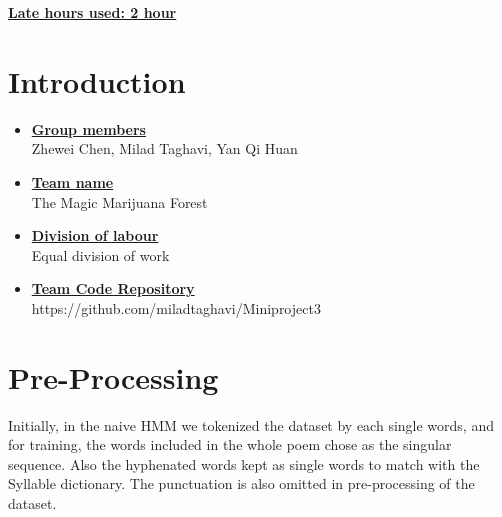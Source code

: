 \newif\ifshowsolutions
\showsolutionstrue

\newcommand{\boldline}[1]{\underline{\textbf{#1}}}
\usepackage{csquotes}

\setlength{\parskip}{1.2em}



\pagestyle{fancy}

\begin{center}
    \boldline{Late hours used: 2 hour}
\end{center}

\section{Introduction}
\medskip
\begin{itemize}

    \item \boldline{Group members} \\
    Zhewei Chen, Milad Taghavi, Yan Qi Huan
    
    \item \boldline{Team name} \\
    The Magic Marijuana Forest
    
    \item \boldline{Division of labour} \\
    Equal division of work
    
    \item \boldline{Team Code Repository} \\
    https://github.com/miladtaghavi/Miniproject3
    

\end{itemize}

\section{Pre-Processing}

Initially, in the naive HMM we tokenized the dataset by each single words, and for training, the words included in the whole poem chose as the singular sequence. Also the hyphenated words kept as single words to match with the Syllable dictionary. The punctuation is also omitted in pre-processing of the dataset.

